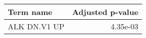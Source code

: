 \begin{tabular}{lr}
\toprule
   Term name &  Adjusted p-value \\
\midrule
ALK DN.V1 UP &          4.35e-03 \\
\bottomrule
\end{tabular}
